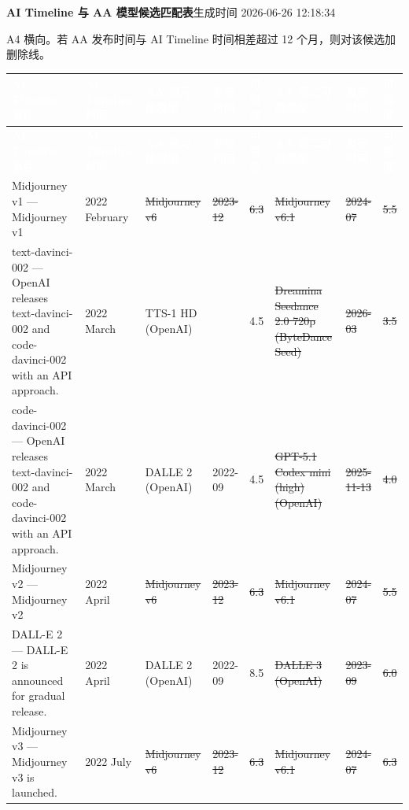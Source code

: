 \documentclass[a4paper,landscape]{article}
\begin{document}
\scriptsize
\textbf{AI Timeline 与 AA 模型候选匹配表}\hfill 生成时间 2026-06-26 12:18:34

\vspace{2pt}
{\footnotesize A4 横向。若 AA 发布时间与 AI Timeline 时间相差超过 12 个月，则对该候选加删除线。}

\vspace{3pt}
\begin{longtable}{|L{8.15cm}|C{1.85cm}|L{4.15cm}|C{1.75cm}|C{0.9cm}|L{4.15cm}|C{1.75cm}|C{0.9cm}|}
\hline
{}
\textcolor{white}{\textbf{AI Timeline 事件}} &
\textcolor{white}{\textbf{AI Timeline 时间}} &
\textcolor{white}{\textbf{AA 最可能模型}} &
\textcolor{white}{\textbf{发布时间}} &
\textcolor{white}{\textbf{可信度}} &
\textcolor{white}{\textbf{AA 第二可能模型}} &
\textcolor{white}{\textbf{发布时间}} &
\textcolor{white}{\textbf{可信度}} \\
\hline
\endfirsthead
\hline
{}
\textcolor{white}{\textbf{AI Timeline 事件}} &
\textcolor{white}{\textbf{AI Timeline 时间}} &
\textcolor{white}{\textbf{AA 最可能模型}} &
\textcolor{white}{\textbf{发布时间}} &
\textcolor{white}{\textbf{可信度}} &
\textcolor{white}{\textbf{AA 第二可能模型}} &
\textcolor{white}{\textbf{发布时间}} &
\textcolor{white}{\textbf{可信度}} \\
\hline
\endhead
Midjourney v1 — Midjourney v1 & 2022 February & \sout{Midjourney v6} & \sout{2023-12} & \sout{6.3} & \sout{Midjourney v6.1} & \sout{2024-07} & \sout{5.5} \\ \hline
text-davinci-002 — OpenAI releases text-davinci-002 and code-davinci-002 with an API approach. & 2022 March & TTS-1 HD (OpenAI) &  & 4.5 & \sout{Dreamina Seedance 2.0 720p (ByteDance Seed)} & \sout{2026-03} & \sout{3.5} \\ \hline
code-davinci-002 — OpenAI releases text-davinci-002 and code-davinci-002 with an API approach. & 2022 March & DALLE 2 (OpenAI) & 2022-09 & 4.5 & \sout{GPT-5.1 Codex mini (high) (OpenAI)} & \sout{2025-11-13} & \sout{4.0} \\ \hline
Midjourney v2 — Midjourney v2 & 2022 April & \sout{Midjourney v6} & \sout{2023-12} & \sout{6.3} & \sout{Midjourney v6.1} & \sout{2024-07} & \sout{5.5} \\ \hline
DALL-E 2 — DALL-E 2 is announced for gradual release. & 2022 April & DALLE 2 (OpenAI) & 2022-09 & 8.5 & \sout{DALLE 3 (OpenAI)} & \sout{2023-09} & \sout{6.0} \\ \hline
Midjourney v3 — Midjourney v3 is launched. & 2022 July & \sout{Midjourney v6} & \sout{2023-12} & \sout{6.3} & \sout{Midjourney v6.1} & \sout{2024-07} & \sout{6.3} \\ \hline

\end{longtable}
\end{document}
